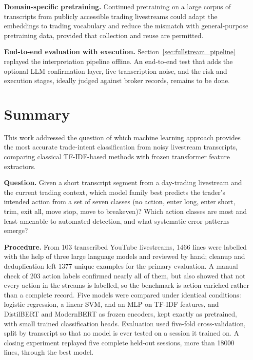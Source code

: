 \textbf{Domain-specific pretraining.} Continued pretraining on a large corpus of transcripts from publicly accessible trading livestreams could adapt the embeddings to trading vocabulary and reduce the mismatch with general-purpose pretraining data, provided that collection and reuse are permitted.

\textbf{End-to-end evaluation with execution.} Section~\ref{sec:fullstream_pipeline} replayed the interpretation pipeline offline. An end-to-end test that adds the optional LLM confirmation layer, live transcription noise, and the risk and execution stages, ideally judged against broker records, remains to be done.



\section{Summary}
\label{sec:summary}

This work addressed the question of which machine learning approach provides the most accurate trade-intent classification from noisy livestream transcripts, comparing classical TF-IDF-based methods with frozen transformer feature extractors.

\textbf{Question.} Given a short transcript segment from a day-trading livestream and the current trading context, which model family best predicts the trader's intended action from a set of seven classes (no action, enter long, enter short, trim, exit all, move stop, move to breakeven)? Which action classes are most and least amenable to automated detection, and what systematic error patterns emerge?

\textbf{Procedure.} From 103 transcribed YouTube livestreams, 1466 lines were labelled with the help of three large language models and reviewed by hand; cleanup and deduplication left 1377 unique examples for the primary evaluation. A manual check of 203 action labels confirmed nearly all of them, but also showed that not every action in the streams is labelled, so the benchmark is action-enriched rather than a complete record. Five models were compared under identical conditions: logistic regression, a linear SVM, and an MLP on TF-IDF features, and DistilBERT and ModernBERT as frozen encoders, kept exactly as pretrained, with small trained classification heads. Evaluation used five-fold cross-validation, split by transcript so that no model is ever tested on a session it trained on. A closing experiment replayed five complete held-out sessions, more than 18000 lines, through the best model.

